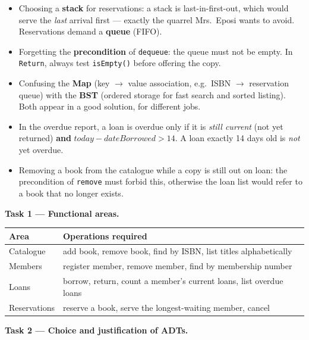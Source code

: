 \documentclass[11pt]{article}
\newcounter{popsec}
\newcounter{popsub}
\newcommand{\courssub}[1]{%
  \stepcounter{popsub}%
  \par\vspace{9pt}\noindent{\popxbold\fontsize{11.5}{13}\selectfont\color{popink}{\color{poporange}\thepopsec.\thepopsub}\hspace{6pt}#1}\par\nopagebreak\vspace{4pt}
}
\begin{document}
\begin{attention}
\begin{itemize}
\item Choosing a \textbf{stack} for reservations: a stack is last-in-first-out, which would serve the \emph{last} arrival first — exactly the quarrel Mrs.\ Eposi wants to avoid. Reservations demand a \textbf{queue} (FIFO).
\item Forgetting the \textbf{precondition} of \texttt{dequeue}: the queue must not be empty. In \texttt{Return}, always test \texttt{isEmpty()} before offering the copy.
\item Confusing the \textbf{Map} (key $\rightarrow$ value association, e.g.\ ISBN $\rightarrow$ reservation queue) with the \textbf{BST} (ordered storage for fast search and sorted listing). Both appear in a good solution, for different jobs.
\item In the overdue report, a loan is overdue only if it is \emph{still current} (not yet returned) \textbf{and} $today - dateBorrowed > 14$. A loan exactly 14 days old is \emph{not} yet overdue.
\item Removing a book from the catalogue while a copy is still out on loan: the precondition of \texttt{remove} must forbid this, otherwise the loan list would refer to a book that no longer exists.
\end{itemize}
\end{attention}

\courssub{Model answer}

\textbf{Task 1 — Functional areas.}

\begin{center}
\begin{tabularx}{\linewidth}{|l|X|}
\hline
\rowcolor{popblueL} \textbf{Area} & \textbf{Operations required} \\
\hline
Catalogue & add book, remove book, find by ISBN, list titles alphabetically \\
\hline
Members & register member, remove member, find by membership number \\
\hline
Loans & borrow, return, count a member's current loans, list overdue loans \\
\hline
Reservations & reserve a book, serve the longest-waiting member, cancel \\
\hline
\end{tabularx}
\end{center}

\textbf{Task 2 — Choice and justification of ADTs.}
\end{document}
